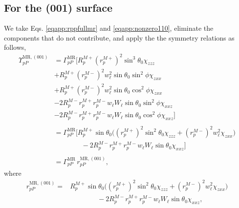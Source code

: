 \subsection{For the (001) surface}

We take Eqs. \eqref{eqapp:rppfullmr} and \eqref{eqapp:nonzero110}, eliminate the
components that do not contribute, and apply the the symmetry relations as
follows,
\begin{equation*}
\begin{split}
\Upsilon^{\mathrm{MR},(001)}_{pP} &=
\Gamma^{\mathrm{MR}}_{pP}
\big[
R^{M+}_{p}\left(r^{M+}_{p}\right)^{2}\sin^{3}\theta_{0}\chi_{zzz}\\
&+R^{M+}_{p}\left(r^{M-}_{p}\right)^{2}w^{2}_{\ell}
            \sin\theta_{0}\sin^{2}\phi\chi_{zxx}\\
&+R^{M+}_{p}\left(r^{M-}_{p}\right)^{2}w^{2}_{\ell}
            \sin\theta_{0}\cos^{2}\phi\chi_{zxx}\\
&-2R^{M-}_{p}r^{M+}_{p}r^{M-}_{p}w_{\ell}W_{\ell}
            \sin\theta_{0}\sin^{2}\phi\chi_{xxz}\\
&-2R^{M-}_{p}r^{M+}_{p}r^{M-}_{p}w_{\ell}W_{\ell}
            \sin\theta_{0}\cos^{2}\phi\chi_{xxz}
\big]\\\\
&=
\Gamma^{\mathrm{MR}}_{pP}
\big[
R^{M+}_{p}\sin\theta_{0}
\bigg(
\left(r^{M+}_{p}\right)^{2}\sin^{2}\theta_{0}\chi_{zzz}
+ \left(r^{M-}_{p}\right)^{2}w^{2}_{\ell}\chi_{zxx}
\bigg)\\
&\qquad\qquad- 2R^{M-}_{p}r^{M+}_{p}r^{M-}_{p}w_{\ell}W_{\ell}\sin\theta_{0}
\chi_{xxz}
\big]\\\\
&= \Gamma^{\mathrm{MR}}_{pP}\,r^{\mathrm{MR},(001)}_{pP},
\end{split}
\end{equation*}
where
\begin{equation}\label{eqapp:final-rpp.mr.001}
\begin{split}
r^{\mathrm{MR},(001)}_{pP} = 
&R^{M+}_{p}\sin\theta_{0}
\bigg(
\left(r^{M+}_{p}\right)^{2}\sin^{2}\theta_{0}\chi_{zzz}
+ \left(r^{M-}_{p}\right)^{2}w^{2}_{\ell}\chi_{zxx}
\bigg)\\
&\qquad\qquad- 2R^{M-}_{p}r^{M+}_{p}r^{M-}_{p}w_{\ell}W_{\ell}\sin\theta_{0}
\chi_{xxz},
\end{split}
\end{equation}

